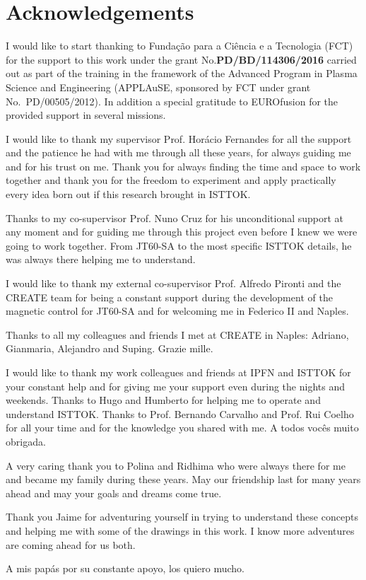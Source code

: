 \chapter*{Acknowledgements}

I would like to start thanking to Funda\c{c}\~{a}o para a Ci\^{e}ncia e a Tecnologia (FCT) for the support to this work under the grant No.\textbf{PD/BD/114306/2016} carried out as part of the training in the framework of the Advanced Program in Plasma Science and Engineering (APPLAuSE, sponsored by FCT under grant No.~PD/00505/2012). In addition a special gratitude to EUROfusion for the provided support in several missions. 
\smallskip

I would like to thank my supervisor Prof. Horácio Fernandes for all the support and the patience he had with me through all these years, for always guiding me and for his trust on me. Thank you for always finding the time and space to work together and thank you for the  freedom to experiment and apply practically every idea born out if this research brought in ISTTOK.
\smallskip

Thanks to my co-supervisor Prof. Nuno Cruz for his unconditional support at any moment and for guiding me through this project even before I knew we were going to work together. From JT60-SA to the most specific ISTTOK details, he was always there helping me to understand.
\smallskip

I would like to thank my external co-supervisor Prof. Alfredo Pironti and the CREATE team for being a constant support during the development of the magnetic control for JT60-SA  and for welcoming me in Federico II and Naples. \smallskip

Thanks to all my colleagues and friends I met at CREATE in Naples: Adriano, Gianmaria, Alejandro and Suping. Grazie mille.\smallskip

I would like to thank my work colleagues and friends at IPFN and ISTTOK for your constant help and for giving me your support even during the nights and weekends. Thanks to Hugo and Humberto for helping me to operate and understand ISTTOK. Thanks to Prof. Bernando Carvalho and Prof. Rui Coelho for all your time and for the knowledge you shared with me. A todos vocês muito obrigada.\smallskip


A very caring thank you to Polina and Ridhima who were always there for me and became my family during these years. May our friendship last for many years ahead and may your goals and dreams come true.\smallskip

Thank you Jaime for adventuring yourself in trying to understand these concepts and helping me with some of the drawings in this work. I know more adventures are coming ahead for us both.\smallskip

A mis papás por su constante apoyo, los quiero mucho.   

 





